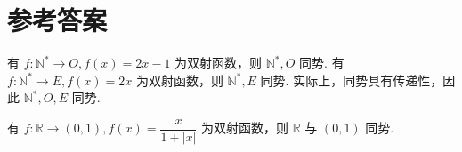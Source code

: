 \chapter{参考答案}

\begin{answer} \label{ans:odd-even-union}
  \begin{solution}
    有 $f: \mathbb{N}^* \to O, f(x) = 2x - 1$ 为双射函数，则 $\mathbb{N}^*, O$ 同势.
    有 $f: \mathbb{N}^* \to E, f(x) = 2x$ 为双射函数，则 $\mathbb{N}^*, E$ 同势.
    实际上，同势具有传递性，因此 $\mathbb{N}^*, O, E$ 同势.
  \end{solution}
\end{answer}

\begin{answer} \label{ans:real-number-interval}
  \begin{solution}
    有 $f: \mathbb{R} \to (0, 1), f(x) = \dfrac{x}{1 + |x|}$ 为双射函数，则 $\mathbb{R}$ 与 $(0, 1)$ 同势.
  \end{solution}
\end{answer}
